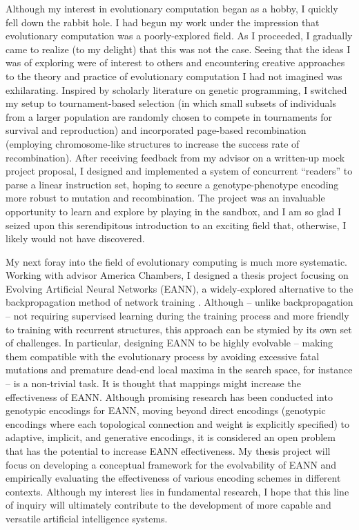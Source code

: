 \documentclass[12pt]{book}
\begin{document}
Although my interest in evolutionary computation began as a hobby, I quickly fell down the rabbit hole. I had begun my work under the impression that evolutionary computation was a poorly-explored field. As I proceeded, I gradually came to realize (to my delight) that this was not the case. Seeing that the ideas I was of exploring were of interest to others and encountering creative approaches to the theory and practice of evolutionary computation I had not imagined was exhilarating. Inspired by scholarly literature on genetic programming, I switched my setup to tournament-based selection (in which small subsets of individuals from a larger population are randomly chosen to compete in tournaments for survival and reproduction) and incorporated page-based recombination (employing chromosome-like structures to increase the success rate of recombination). After receiving feedback from my advisor on a written-up mock project proposal, I designed and implemented a system of concurrent “readers” to parse a linear instruction set, hoping to secure a genotype-phenotype encoding more robust to mutation and recombination. The project was an invaluable opportunity to learn and explore by playing in the sandbox, and I am so glad I seized upon this serendipitous introduction to an exciting field that, otherwise, I likely would not have discovered.

My next foray into the field of evolutionary computing is much more systematic. Working with advisor America Chambers, I designed a thesis project focusing on Evolving Artificial Neural Networks (EANN), a widely-explored alternative to the backpropagation method of network training \cite{DowningIntelligenceSystems}. Although -- unlike backpropagation -- not requiring supervised learning during the training process and more friendly to training with recurrent structures, this approach can be stymied by its own set of challenges. In particular, designing EANN to be highly evolvable  --  making them compatible with the evolutionary process by avoiding excessive fatal mutations and premature dead-end local maxima in the search space, for instance  --  is a non-trivial task. It is thought that  mappings might increase the effectiveness of EANN. Although promising research has been conducted into genotypic encodings for EANN, moving beyond direct encodings (genotypic encodings where each topological connection and weight is explicitly specified) to adaptive, implicit, and generative encodings, it is considered an open problem that has the potential to increase EANN effectiveness. My thesis project will focus on developing a conceptual framework for the evolvability of EANN and empirically evaluating the effectiveness of various encoding schemes in different contexts. Although my interest lies in fundamental research, I hope that this line of inquiry will ultimately contribute to the development of more capable and versatile artificial intelligence systems.
\end{document}
